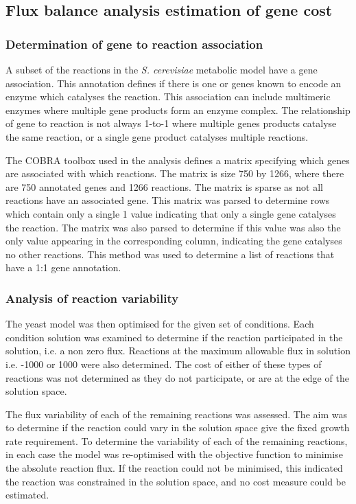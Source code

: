 \subsection{Flux balance analysis estimation of gene cost}

\subsubsection{Determination of gene to reaction association}

A subset of the reactions in the \emph{S. cerevisiae} metabolic model have a gene association. This annotation defines if there is one or genes known to encode an enzyme which catalyses the reaction. This association can include multimeric enzymes where multiple gene products form an enzyme complex. The relationship of gene to reaction is not always 1-to-1 where multiple genes products catalyse the same reaction, or a single gene product catalyses multiple reactions. 

The COBRA toolbox used in the analysis defines a matrix specifying which genes are associated with which reactions. The matrix is size 750 by 1266, where there are 750 annotated genes and 1266 reactions. The matrix is sparse as not all reactions have an associated gene. This matrix was parsed to determine rows which contain only a single 1 value indicating that only a single gene catalyses the reaction. The matrix was also parsed to determine if this value was also the only value appearing in the corresponding column, indicating the gene catalyses no other reactions. This method was used to determine a list of reactions that have a 1:1 gene annotation.

\subsubsection{Analysis of reaction variability}

The yeast model was then optimised for the given set of conditions. Each condition solution was examined to determine if the reaction participated in the solution, i.e. a non zero flux. Reactions at the maximum allowable flux in solution i.e. -1000 or 1000 were also determined. The cost of either of these types of reactions was not determined as they do not participate, or are at the edge of the solution space.

The flux variability of each of the remaining reactions was assessed. The aim was to determine if the reaction could vary in the solution space give the fixed growth rate requirement. To determine the variability of each of the remaining reactions, in each case the model was re-optimised with the objective function to minimise the absolute reaction flux. If the reaction could not be minimised, this indicated the reaction was constrained in the solution space, and no cost measure could be estimated.

